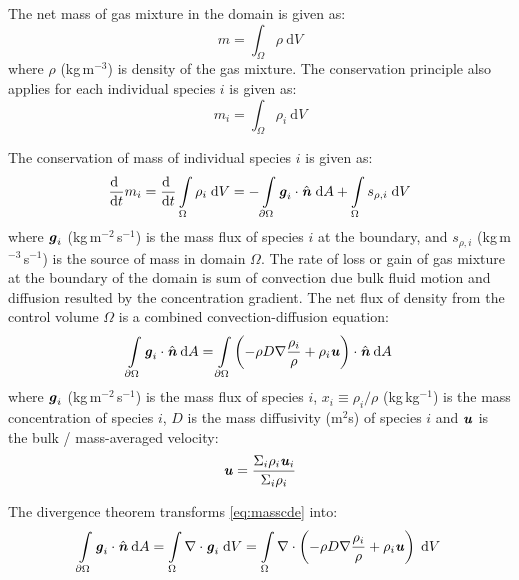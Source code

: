The net mass of gas mixture in the domain is given as:
\begin{equation}
m = \int_\Omega  \rho \:\mathrm{d}V
\end{equation}
where $\rho$ (kg\,m$^{-3}$) is density of the gas mixture. The conservation principle also applies for each individual species $i$ is given as:
\begin{equation}
{m_i} = \int_\Omega  {{\rho _i}\:\mathrm{d}V}
\end{equation}

The conservation of mass of individual species $i$ is given as:
\begin{equation}
\frac{\mathrm{d}~}{\mathrm{d}t} {m_i} = \frac{\mathrm{d}~}{\mathrm{d}t} \int \limits_{\Omega} \rho_i\;\mathrm{d}V= - \int \limits_{\partial \Omega } \textbf{\textit{g}}_i\cdot\hat{\textbf{\textit{n}}}\;\mathrm{d}A + \int \limits_{\Omega} s_{\rho,i}\;\mathrm{d}V
\end{equation}
where $\textbf{\textit{g}}_i$ (kg\,m$^{-2}$\,s$^{-1}$) is the mass flux of species $i$ at the boundary, and $s_{\rho,i}$ (kg\,m$^{-3}$\,s$^{-1}$) is the source of mass in domain $\Omega$. The rate of loss or gain of gas mixture at the boundary of the domain is sum of convection due bulk fluid motion and diffusion resulted by the concentration gradient. The net flux of density from the control volume $\Omega$ is a combined convection-diffusion equation:
\begin{equation}
\int \limits_{\partial \Omega } {{{\textbf{\textit{g}}}_i}}  \cdot \hat{\textbf{\textit{n}}}\:\mathrm{d}A = \int \limits_{\partial \Omega } {\left( { - {\rho}{D}\nabla \frac{{{\rho _i}}}{{{\rho}}} + {\rho _i}{\textbf{\textit{u}}}} \right)}  \cdot \hat{\textbf{\textit{n}}}\:\mathrm{d}A
\label{eq:masscde}
\end{equation}
where $\textbf{\textit{g}}_i$ (kg\,m$^{-2}$\,s$^{-1}$) is the mass flux of species $i$, $x_i \equiv \rho_i/\rho$ (kg\,kg$^{-1}$) is the mass concentration of species $i$, $D$ is the mass diffusivity (m$^2$s) of species $i$ and $\textbf{\textit{u}}$ is the bulk / mass-averaged velocity:
\begin{equation}
{\textbf{\textit{u}}} = \frac{{{\Sigma _i}{\rho _i}{{\textbf{\textit{u}}}_i}}}{{{\Sigma _i}{\rho _i}}}
\end{equation}

The divergence theorem transforms \ref{eq:masscde} into:
\begin{equation}
\int \limits_{\partial \Omega } {{{\textbf{\textit{g}}}_i}}  \cdot \hat{\textbf{\textit{n}}}\:\mathrm{d}A = \int \limits_\Omega  \nabla  \cdot {{\textbf{\textit{g}}}_i}\;\mathrm{d}V = \int \limits_\Omega  \nabla  \cdot \left( { - \rho D\nabla \frac{{{\rho _i}}}{{{\rho }}} + {\rho _i}{\textbf{\textit{u}}}} \right)\;\mathrm{d}V
\end{equation}


